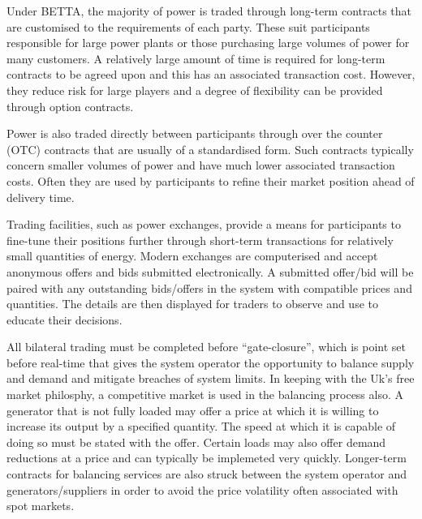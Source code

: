 Under BETTA, the majority of power is traded through long-term contracts
that are customised to the requirements of each party.  These suit participants
responsible for large power plants or those purchasing large volumes of
power for many customers.  A relatively large amount of time is required for
long-term contracts to be agreed upon and this has an associated transaction
cost.  However, they reduce risk for large players and a degree of flexibility
can be provided through option contracts.

Power is also traded directly between participants through over the counter
(OTC) contracts that are usually of a standardised form.  Such contracts
typically concern smaller volumes of power and have much lower associated
transaction costs.  Often they are used by participants to refine their market
position ahead of delivery time.

Trading facilities, such as power exchanges, provide a means for participants
to fine-tune their positions further through short-term transactions for
relatively small quantities of energy.  Modern exchanges are computerised and
accept anonymous offers and bids submitted electronically.  A submitted
offer/bid will be paired with any outstanding bids/offers in the system with
compatible prices and quantities.  The details are then displayed for traders
to observe and use to educate their decisions.

All bilateral trading must be completed before ``gate-closure'', which is point
set before real-time that gives the system operator the opportunity to balance
supply and demand and mitigate breaches of system limits.  In keeping with the
Uk's free market philosphy, a competitive market is used in the balancing
process also.  A generator that is not fully loaded may offer a price at which
it is willing to increase its output by a specified quantity.  The speed at
which it is capable of doing so must be stated with the offer.  Certain loads
may also offer demand reductions at a price and can typically be implemeted
very quickly.  Longer-term contracts for balancing services are also struck
between the system operator and generators/suppliers in order to avoid the
price volatility often associated with spot markets.

